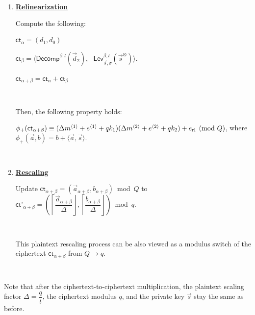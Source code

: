 \begin{tcolorbox}[title={\textbf{\tboxlabel{\ref*{subsubsec:bfv-mult-cipher-tfhe}} Leveled LWE Tensor Multiplication}}]
\begin{enumerate}
\item \textbf{\underline{Relinearization}} 


Compute the following:

$ \textsf{ct}_\alpha = (d
_1, d_0)$

$ \textsf{ct}_\beta = \bm{\langle} \textsf{Decomp}^{\beta, l}(\vec{d}_2), \text{ } \textsf{Lev}_{\vec{s}, \sigma}^{\beta, l}(\vec{s}^{\otimes}) \bm{\rangle}$.

$ \textsf{ct}_{\alpha + \beta} = \textsf{ct}_{\alpha} + \textsf{ct}_{\beta}$

$ $

Then, the following property holds:

$\phi_{+}(\textsf{ct}_{\alpha+\beta})\equiv(\Delta m^{\langle1\rangle}+e^{\langle1\rangle}+qk_1)(\Delta m^{\langle2\rangle}+e^{\langle2\rangle}+qk_2)+e_{\rm rl}\pmod Q$, where $\phi_+(\vec a,b)=b+\langle\vec a,\vec s\rangle$.

$ $




\item \textbf{\underline{Rescaling}}

Update $\textsf{ct}_{\alpha + \beta} = (\vec{a}_{\alpha + \beta}, b_{\alpha + \beta}) \bmod Q$ to $\textsf{ct'}_{\alpha + \beta} = \left(\left\lceil\dfrac{\vec{a}_{\alpha + \beta}}{\Delta}\right\rfloor, \left\lceil\dfrac{b_{\alpha + \beta}}{\Delta}\right\rfloor\right) \bmod q$. 

$ $

This plaintext rescaling process can be also viewed as a modulus switch of the ciphertext $\textsf{ct}_{\alpha + \beta}$ from $Q \rightarrow q$. 


$ $

\end{enumerate}

Note that after the ciphertext-to-ciphertext multiplication, the plaintext scaling factor $\Delta=\dfrac{q}{t}$, the ciphertext modulus $q$, and the private key $\vec{s}$ stay the same as before.



\end{tcolorbox}



